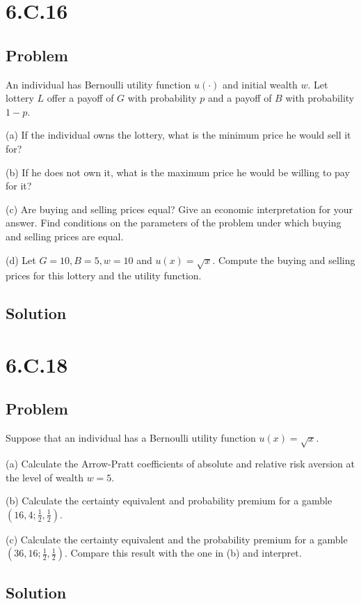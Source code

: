 \documentclass[10pt, a4paper]{article}
\begin{document}
  \section*{6.C.16}
    \subsection*{Problem}
      An individual has Bernoulli utility function $u(\cdot)$ and initial wealth $w$. Let lottery $L$ offer a payoff of $G$ with probability $p$ and a payoff of $B$ with probability $1-p$.

      (a) If the individual owns the lottery, what is the minimum price he would sell it for?

      (b) If he does not own it, what is the maximum price he would be willing to pay for it?

      (c) Are buying and selling prices equal? Give an economic interpretation for your answer. Find conditions on the parameters of the problem under which buying and selling prices are equal.

      (d) Let $G=10, B=5, w=10$ and $u(x) = \sqrt{x}$. Compute the buying and selling prices for this lottery and the utility function. 
    \subsection*{Solution}

  \section*{6.C.18}
    \subsection*{Problem}
      Suppose that an individual has a Bernoulli utility function $u(x) = \sqrt{x}$.

      (a) Calculate the Arrow-Pratt coefficients of absolute and relative risk aversion at the level of wealth $w=5$.

      (b) Calculate the certainty equivalent and probability premium for a gamble $(16,4;\frac{1}{2},\frac{1}{2})$.

      (c) Calculate the certainty equivalent and the probability premium for a gamble $(36, 16; \frac{1}{2}, \frac{1}{2})$. Compare this result with the one in (b) and interpret.
    \subsection*{Solution}
\end{document}
